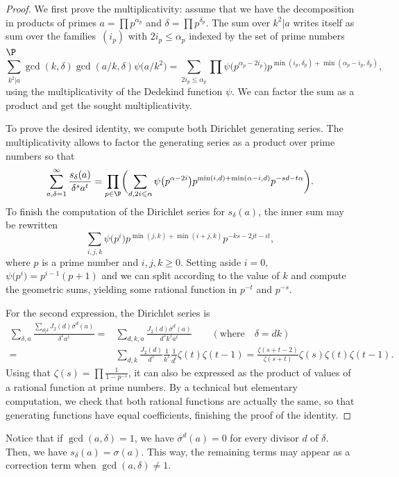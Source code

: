\begin{proof}
We first prove the multiplicativity: assume that we have the decomposition in products of primes $a=\prod p^{\alpha_p}$ and $\delta=\prod p^{\delta_p}$. The sum over $k^2|a$ writes itself as sum over the families~$(i_p)$ with $2i_p\leqslant \alpha_p$ indexed by the set of prime numbers $\P$
\[ \sum_{k^2|a}\gcd(k,\delta)\gcd(a/k,\delta)\psi\bigl(a/k^2\bigr) = \sum_{2i_p\leqslant \alpha_p}\prod \psi\bigl(p^{\alpha_p-2i_p}\bigr)p^{\min(i_p,\delta_p)+\min(\alpha_p-i_p,\delta_p)}, \]
using the multiplicativity of the Dedekind function $\psi$. We can factor the sum as a product and get the sought multiplicativity.

To prove the desired identity, we compute both Dirichlet generating series. The multiplicativity allows to factor the generating series as a product over prime numbers so that
\[ \sum_{a,\delta=1}^\infty \frac{s_\delta(a)}{\delta^sa^t} = \prod_{p\in\P} \biggl(\sum_{d,2i\leqslant\alpha} \psi\bigl(p^{\alpha-2i}\bigr)p^{\min(i,d)+\min(\alpha-i,d)}p^{-sd-t\alpha} \biggr). \]
To finish the computation of the Dirichlet series for $s_\delta(a)$, the inner sum may be rewritten
\[ \sum_{i,j,k}\psi\bigl(p^i\bigr)p^{\min(j,k)+\min(i+j,k)}p^{-ks-2jt-it}, \]
where $p$ is a prime number and $i,j,k\geqslant 0$. Setting aside $i=0$, $\psi\bigl(p^i\bigr)=p^{i-1}(p+1)$ and we can split according to the value of $k$ and compute the geometric sums, yielding some rational function in $p^{-t}$ and $p^{-s}$.

For the second expression, the Dirichlet series is
\begin{align*}
\sum_{\delta,a} \frac{\sum_{d|\delta} J_2(d)\overline{\sigma}^d(a)}{\delta^s a^t} ={} & \sum_{d,k,a}\frac{J_2(d)\overline{\sigma}^d(a)}{d^sk^sa^t} \qquad(\text{where}\quad\delta=dk) \\
= {}& \sum_{d,k} \frac{J_2(d)}{d^s}\frac{1}{k^s}\frac{1}{d^t}\zeta(t)\zeta(t-1)
= \frac{\zeta(s+t-2)}{\zeta(s+t)}\zeta(s)\zeta(t)\zeta(t-1).
\end{align*}
Using that $\zeta(s)=\prod\frac{1}{1-p^{-s}}$, it can also be expressed as the product of values of a rational function at prime numbers. By a technical but elementary computation, we check that both rational functions are actually the same, so that generating functions have equal coefficients, finishing the proof of the identity.
\end{proof}

Notice that if $\gcd(a,\delta)=1$, we have $\overline{\sigma}^d(a)=0$ for every divisor $d$ of $\delta$. Then, we have $s_\delta(a)=\sigma(a)$. This way, the remaining terms may appear as a correction term when $\gcd(a,\delta)\neq 1$.



